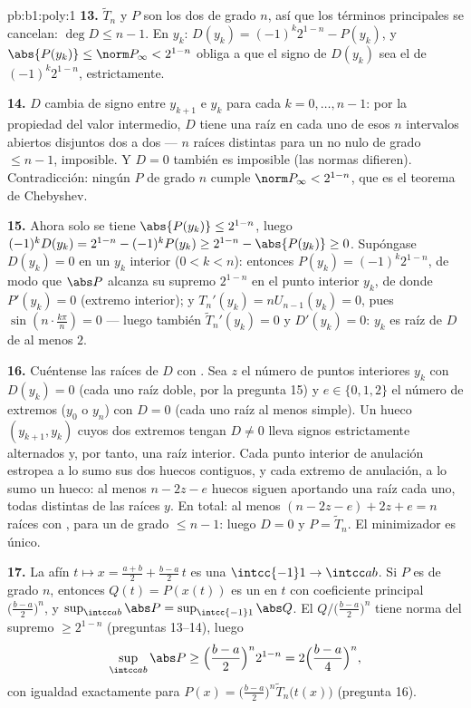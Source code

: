 \begin{solution}{pb:b1:poly:1}
\textbf{13.} $\widetilde T_n$ y $P$ son los dos  de grado $n$,
así que los términos principales se cancelan: $\deg D \leq n - 1$. En
$y_k$: $D(y_k) = (-1)^k2^{1-n} - P(y_k)$, y
$\abs{P(y_k)} \leq \norm P_\infty < 2^{1-n}$ obliga a que el signo de
$D(y_k)$ sea el de $(-1)^k2^{1-n}$, estrictamente.

\textbf{14.} $D$ cambia de signo entre $y_{k+1}$ e $y_k$ para cada
$k = 0, \dots, n-1$: por la propiedad del valor intermedio, $D$ tiene
una raíz en cada uno de esos $n$ intervalos abiertos disjuntos dos a
dos --- $n$ raíces distintas para un  no nulo de grado
$\leq n - 1$, imposible. Y $D = 0$ también es imposible (las normas
difieren). Contradicción: ningún $P$  de grado $n$ cumple
$\norm P_\infty < 2^{1-n}$, que es el teorema de Chebyshev.

\textbf{15.} Ahora solo se tiene $\abs{P(y_k)} \leq 2^{1-n}$, luego
$(-1)^k D(y_k) = 2^{1-n} - (-1)^kP(y_k) \geq 2^{1-n} - \abs{P(y_k)}
\geq 0$. Supóngase $D(y_k) = 0$ en un $y_k$ interior ($0 < k < n$):
entonces $P(y_k) = (-1)^k2^{1-n}$, de modo que $\abs P$ alcanza su
supremo $2^{1-n}$ en el punto interior $y_k$, de donde $P'(y_k) = 0$
(extremo interior); y $T_n'(y_k) = nU_{n-1}(y_k) = 0$, pues
$\sin(n\cdot\frac{k\pi}n) = 0$ --- luego también
$\widetilde T_n'(y_k) = 0$ y $D'(y_k) = 0$: $y_k$ es raíz de $D$ de
 al menos $2$.

\textbf{16.} Cuéntense las raíces de $D$ con . Sea $z$ el
número de puntos interiores $y_k$ con $D(y_k) = 0$ (cada uno raíz
doble, por la pregunta 15) y $e \in \{0, 1, 2\}$ el número de extremos
($y_0$ o $y_n$) con $D = 0$ (cada uno raíz al menos simple). Un hueco
$(y_{k+1}, y_k)$ cuyos dos extremos tengan $D \neq 0$ lleva signos
estrictamente alternados y, por tanto, una raíz interior. Cada punto
interior de anulación estropea a lo sumo sus dos huecos contiguos, y
cada extremo de anulación, a lo sumo un hueco: al menos
$n - 2z - e$ huecos siguen aportando una raíz cada uno, todas
distintas de las raíces $y$. En total: al menos $(n - 2z - e) + 2z + e
= n$ raíces con , para un  de grado $\leq n - 1$:
luego $D = 0$ y $P = \widetilde T_n$. El minimizador es único.

\textbf{17.} La  afín $t \mapsto x = \frac{a+b}2 +
\frac{b-a}2\,t$ es una  $\intcc{-1}1 \to \intcc ab$. Si $P$ es
 de grado $n$, entonces $Q(t) = P(x(t))$ es un  en
$t$ con coeficiente principal $\bigl(\frac{b-a}2\bigr)^n$, y
$\sup_{\intcc ab}\abs P = \sup_{\intcc{-1}1}\abs Q$. El
 $Q/\bigl(\frac{b-a}2\bigr)^n$ tiene norma del supremo
$\geq 2^{1-n}$ (preguntas 13--14), luego
\[
\sup_{\intcc ab}\abs P \geq \Bigl(\frac{b-a}2\Bigr)^n 2^{1-n}
= 2\Bigl(\frac{b-a}4\Bigr)^n ,
\]
con igualdad exactamente para $P(x) = \bigl(\frac{b-a}2\bigr)^n
\widetilde T_n\bigl(t(x)\bigr)$ (pregunta 16).


\end{solution}
